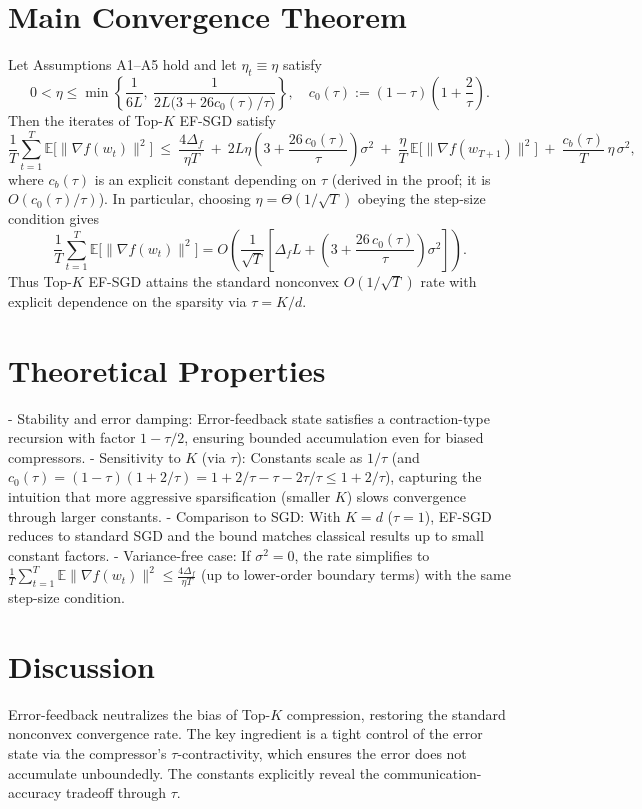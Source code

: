 \documentclass[11pt]{article}
\newcommand{\E}{\mathbb{E}}
\begin{document}
\section*{Main Convergence Theorem}
Let Assumptions A1--A5 hold and let $\eta_t \equiv \eta$ satisfy
\[
0 < \eta \le \min\left\{ \frac{1}{6L},\ \frac{1}{2L\bigl(3 + 26 c_0(\tau)/\tau\bigr)}\right\},\quad
c_0(\tau) := (1-\tau)\left(1 + \frac{2}{\tau}\right).
\]
Then the iterates of Top-$K$ EF-SGD satisfy
\[
\frac{1}{T}\sum_{t=1}^T \E\bigl[\|\nabla f(w_t)\|^2\bigr]
\ \le\ 
\frac{4\Delta_f}{\eta T}
\ +\ 2L\eta \left(3 + \frac{26\,c_0(\tau)}{\tau}\right)\sigma^2
\ +\ \frac{\eta}{T}\,\E\bigl[\|\nabla f(w_{T+1})\|^2\bigr]
\ +\ \frac{c_b(\tau)}{T}\,\eta\,\sigma^2,
\]
where $c_b(\tau)$ is an explicit constant depending on $\tau$ (derived in the proof; it is $O(c_0(\tau)/\tau)$). In particular, choosing $\eta = \Theta(1/\sqrt{T})$ obeying the step-size condition gives
\[
\frac{1}{T}\sum_{t=1}^T \E\bigl[\|\nabla f(w_t)\|^2\bigr]
= O\!\left(\frac{1}{\sqrt{T}}\left[\Delta_f L + \left(3 + \frac{26\,c_0(\tau)}{\tau}\right)\sigma^2\right]\right).
\]
Thus Top-$K$ EF-SGD attains the standard nonconvex $O(1/\sqrt{T})$ rate with explicit dependence on the sparsity via $\tau = K/d$.

\section*{Theoretical Properties}
- Stability and error damping: Error-feedback state satisfies a contraction-type recursion with factor $1-\tau/2$, ensuring bounded accumulation even for biased compressors.
- Sensitivity to $K$ (via $\tau$): Constants scale as $1/\tau$ (and $c_0(\tau)= (1-\tau)(1+2/\tau)=1+2/\tau - \tau - 2\tau/\tau \le 1+2/\tau$), capturing the intuition that more aggressive sparsification (smaller $K$) slows convergence through larger constants.
- Comparison to SGD: With $K=d$ ($\tau=1$), EF-SGD reduces to standard SGD and the bound matches classical results up to small constant factors.
- Variance-free case: If $\sigma^2=0$, the rate simplifies to $\frac{1}{T}\sum_{t=1}^T \E\|\nabla f(w_t)\|^2 \le \frac{4\Delta_f}{\eta T}$ (up to lower-order boundary terms) with the same step-size condition.

\section*{Discussion}
Error-feedback neutralizes the bias of Top-$K$ compression, restoring the standard nonconvex convergence rate. The key ingredient is a tight control of the error state via the compressor's $\tau$-contractivity, which ensures the error does not accumulate unboundedly. The constants explicitly reveal the communication-accuracy tradeoff through $\tau$.
\end{document}
